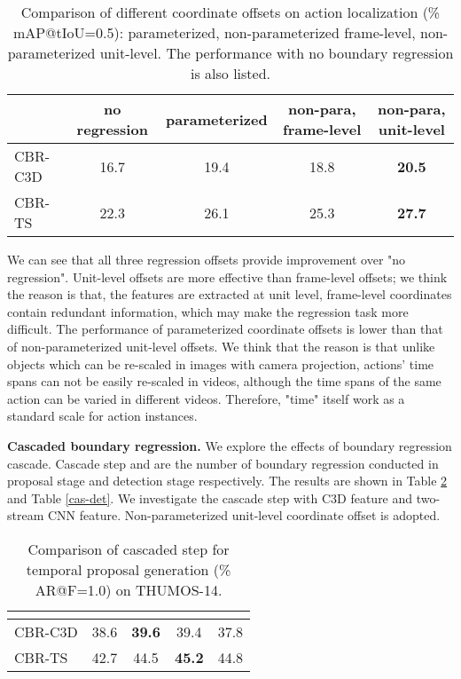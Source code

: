 \documentclass{bmvc2k}
\begin{document}
\begin{table}[h]\small
\centering
\caption{Comparison of different coordinate offsets on action localization (\% mAP@tIoU=0.5): parameterized, non-parameterized frame-level, non-parameterized unit-level. The performance with no boundary regression is also listed.}
\label{offset}
\begin{tabular}{l|c|c|c|c}
\hline
          & no regression & \multicolumn{1}{c|}{parameterized} & \multicolumn{1}{c|}{non-para, frame-level} & \multicolumn{1}{c}{non-para, unit-level} \\ \hline
CBR-C3D  &      16.7         &        19.4           &          18.8         &      \textbf{20.5}            \\ \hline
CBR-TS &      22.3         &      26.1        &          25.3           &   \textbf{27.7}         \\ \hline
\end{tabular}
\end{table}

We can see that all three regression offsets provide improvement over "no regression". Unit-level offsets are more effective than frame-level offsets; we think the reason is that, the features are extracted at unit level, frame-level coordinates contain redundant information, which may make the regression task more difficult. The performance of parameterized coordinate offsets is lower than that of non-parameterized unit-level offsets. We think that the reason is that unlike objects which can be re-scaled in images with camera projection, actions' time spans can not be easily re-scaled in videos, although the time spans of the same action can be varied in different videos. Therefore, "time" itself work as a standard scale for action instances.

\textbf{Cascaded boundary regression.} We explore the effects of boundary regression cascade. Cascade step  and  are the number of boundary regression conducted in proposal stage and detection stage respectively. The results are shown in Table \ref{cas-prop} and Table \ref{cas-det}. We investigate the cascade step with C3D feature and two-stream CNN feature. Non-parameterized unit-level coordinate offset is adopted.


\begin{table}[h]\small
\centering
\caption{Comparison of cascaded step  for temporal proposal generation (\% AR@F=1.0) on THUMOS-14.}
\label{cas-prop}
\begin{tabular}{l|c|c|c|c}
\hline
           &  & \multicolumn{1}{c|}{} & \multicolumn{1}{c|}{} & \multicolumn{1}{c}{} \\ \hline
CBR-C3D        &   38.6  &      \textbf{39.6}      &       39.4       &     37.8      \\ \hline
CBR-TS &   42.7  &      44.5   &        \textbf{45.2}      &        44.8       \\ \hline
\end{tabular}
\end{table}
\end{document}
